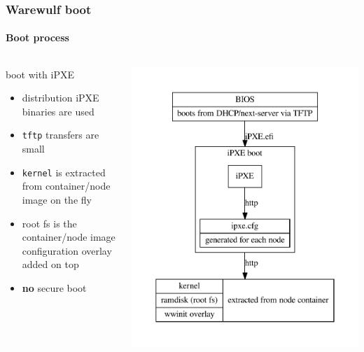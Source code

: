 \documentclass[aspectratio=169]{beamer}
\begin{document}
\begin{frame}[fragile]
\frametitle{Warewulf boot}
\framesubtitle{Boot process}
\begin{columns}
\begin{block}{boot with iPXE}
\begin{itemize}
  \item distribution iPXE binaries are used
  \item \texttt{tftp} transfers are small
  \item \texttt{kernel} is extracted from container/node image on the fly
  \item root fs is the container/node image\\
  configuration overlay added on top
  \item \textbf{no} secure boot
\end{itemize}
\end{block}
\includegraphics[width=.9\linewidth]{ipxe_boot}
\column{2cm}
\end{columns}
\end{frame}
\end{document}
